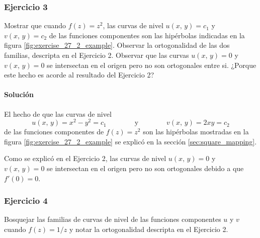 \documentclass[a4paper]{report}
\begin{document}
\subsubsection{Ejercicio 3}

Mostrar que cuando \(f(z)=z^2\), las curvas de nivel \(u(x,\,y)=c_1\) y \(v(x,\,y)=c_2\) de las funciones componentes son las hipérbolas indicadas en la figura \ref{fig:exercise_27_2_example}. Observar la ortogonalidad de las dos familias, descripta en el Ejercicio 2. Observar que las curvas \(u(x,\,y)=0\) y \(v(x,\,y)=0\) se intersectan en el origen pero no son ortogonales entre si. ¿Porque este hecho es acorde al resultado del Ejercicio 2? 

\paragraph{Solución} El hecho de que las curvas de nivel 
\[
 u(x,\,y)=x^2-y^2=c_1
 \qquad\qquad\textrm{y}\qquad\qquad
 v(x,\,y)=2xy=c_2
\]
de las funciones componentes de \(f(z)=z^2\) son las hipérbolas mostradas en la figura \ref{fig:exercise_27_2_example} se explicó en la sección \ref{sec:square_mapping}.

Como se explicó en el Ejercicio 2, las curvas de nivel \(u(x,\,y)=0\) y \(v(x,\,y)=0\) se intersectan en el origen pero no son ortogonales debido a que \(f'(0)=0\).

\subsubsection{Ejercicio 4}

Bosquejar las familias de curvas de nivel de las funciones componentes \(u\) y \(v\) cuando \(f(z)=1/z\) y notar la ortogonalidad descripta en el Ejercicio 2.
\end{document}
